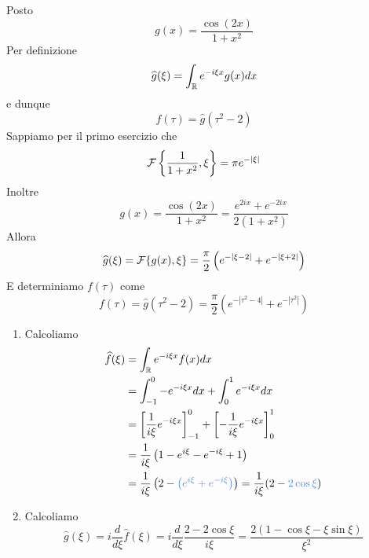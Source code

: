 Posto
\begin{equation*}
g(x) = \frac{\cos(2x)}{1 + x^{2}}
\end{equation*}
Per definizione
\begin{equation*}
\widehat{g}(\xi) = \int _{\mathbb{R} } e^{ - i\xi x} g(x) dx
\end{equation*}
e dunque
\begin{equation*}
f(\tau) = \hat{g}\left(\tau ^{2} - 2\right)
\end{equation*}
Sappiamo per il primo esercizio che
\begin{equation*}
\mathcal{F} \left\{\frac{1}{1 + x^{2}} ,\xi \right\} = \pi e^{ - | \xi | }
\end{equation*}
Inoltre
\begin{equation*}
g(x) = \frac{\cos(2x)}{1 + x^{2}} = \frac{e^{2ix} + e^{ - 2ix}}{2\left(1 + x^{2}\right)}
\end{equation*}
Allora
\begin{equation*}
\widehat{g}(\xi) = \mathcal{F} \{g(x) ,\xi \} = \frac{\pi }{2}\left(e^{ - | \xi - 2| } + e^{ - | \xi + 2| }\right)
\end{equation*}
E determiniamo $f(\tau)$ come
\begin{equation*}
f(\tau) = \hat{g}\left(\tau ^{2} - 2\right) = \frac{\pi }{2}\left(e^{ - \left| \tau ^{2} - 4\right| } + e^{ - \left| \tau ^{2}\right| }\right)
\end{equation*}
\Soluzione
\begin{enumerate}
\item Calcoliamo
\begin{equation*}
\begin{aligned}
\hat{f}(\xi) & = \int _{\RR } e^{ - i\xi x} f(x) dx\\
 & = \int ^{0}_{ - 1} - e^{ - i\xi x} dx + \int ^{1}_{0} e^{ - i\xi x} dx\\
 & = \left[\frac{1}{i\xi } e^{ - i\xi x}\right]^{0}_{ - 1} + \left[ - \frac{1}{i\xi } e^{ - i\xi x}\right]^{1}_{0}\\
 & = \frac{1}{i\xi }\left(1 - e^{i\xi } - e^{ - i\xi } + 1\right)\\
 & = \frac{1}{i\xi }\left(2 - \textcolor[rgb]{0.29,0.56,0.89}{\left(e^{i\xi } + e^{ - i\xi }\right)}\right) = \frac{1}{i\xi }(2 - \textcolor[rgb]{0.29,0.56,0.89}{2\cos\xi })
\end{aligned}
\end{equation*}
\item Calcoliamo
\begin{equation*}
\hat{g}(\xi) = i\frac{d}{d\xi }\hat{f}(\xi) = i\frac{d}{d\xi }\frac{2 - 2\cos \xi }{i\xi } = \frac{2(1 - \cos \xi - \xi \sin \xi)}{\xi ^{2}}
\end{equation*}
\end{enumerate}
\Soluzione

